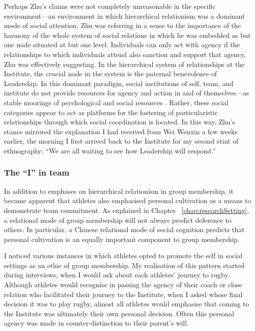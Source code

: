 \begin{CJK}{UTF8}{gbsn}
Perhaps Zhu's claims were not completely unreasonable in the specific environment---an environment in which hierarchical relationism was a dominant mode of social attention.  Zhu was referring in a sense to the importance of the harmony of the whole system of social relations in which he was embedded as but one node situated at but one level. Individuals can only act with agency if the relationships to which individuals attend also sanction and support that agency, Zhu was effectively suggesting.  In the hierarchical system of relationships at the Institute, the crucial node in the system is the paternal benevolence of Leadership.  In this dominant paradigm, social institutions of self, team, and institute do not provide resources for agency and action in and of themselves---as stable moorings of psychological and social resources \citep{Yuki2003}.  Rather, these social categories appear to act as platforms for the fostering of particularistic relationships through which social coordination is located.  In this way, Zhu's stance mirrored the explanation I had received from Wei Wenxin a few weeks earlier, the morning I first arrived back to the Institute for my second stint of ethnography: ``We are all waiting to see how Leadership will respond.''

\subsubsection{The ``I'' in team \label{sect:IinTeam}}
In addition to emphases on hierarchical relationism in group membership, it became apparent that athletes also emphasised personal cultivation as a means to demonstrate team commitment.  As explained in Chapter ~\ref{chap:researchSetting}, a relational mode of group membership will not always predict deference to others.  In particular, a Chinese relational mode of social cognition predicts that personal cultivation is an equally important component to group membership.

I noticed various instances in which athletes opted to promote the self in social settings as an ethic of group membership.  My realisation of this pattern started during interviews, when I would ask about each athletes' journey to rugby.  Although athletes would recognise in passing the agency of their coach or close relation who facilitated their journey to the Institute, when I asked whose final decision it was to play rugby, almost all athletes would emphasise that coming to the Institute was ultimately their own personal decision.  Often this personal agency was made in counter-distinction to their parent's will.


\end{CJK}

